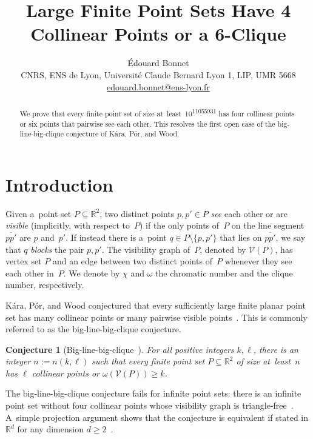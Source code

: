 \documentclass[11pt,a4paper]{article}
\author{\'Edouard Bonnet\\
        {CNRS, ENS de Lyon, Universit\'e Claude Bernard Lyon 1, LIP, UMR 5668}\\
        \href{mailto:edouard.bonnet@ens-lyon.fr}{edouard.bonnet@ens-lyon.fr}
}
\title{Large Finite Point Sets Have 4 Collinear Points or a 6-Clique}
\newtheorem{conjecture}{Conjecture}
\newcommand{\real}{\mathbb{R}}
\newcommand{\vis}{\mathcal V}
\begin{document}
\date{}

\maketitle

\begin{abstract}
  We prove that every finite point set of size at~least~10\textsuperscript{11055931} has four collinear points or six points that pairwise see each other.
  This resolves the first open case of the big-line-big-clique conjecture of Kára, Pór, and Wood. 
\end{abstract}

\section{Introduction}

Given a~point set $P \subseteq \real^2$, two distinct points $p, p' \in P$ \emph{see} each other or are \emph{visible} (implicitly, with respect to~$P$) if the only points of~$P$ on the line segment $\overline{pp'}$ are $p$ and~$p'$.
If instead there is a~point $q \in P \setminus \{p,p'\}$ that lies on $\overline{pp'}$, we say that $q$ \emph{blocks} the pair $p, p'$.
The visibility graph of~$P$, denoted by $\vis(P)$, has vertex set $P$ and an edge between two distinct points of~$P$ whenever they see each other in~$P$.
We denote by $\chi$ and $\omega$ the chromatic number and the clique number, respectively.

Kára, Pór, and Wood conjectured that every sufficiently large finite planar point set has many collinear points or many pairwise visible points~\cite{Kara05}.
This is commonly referred to as the big-line-big-clique conjecture.

\begin{conjecture}[Big-line-big-clique~\cite{Kara05}]\label{conj:blbc}
  For all positive integers $k, \ell$, there is an integer $n := n(k, \ell)$ such that every finite point set $P \subseteq \real^2$ of size at~least~$n$ has $\ell$ collinear points or $\omega(\vis(P)) \geqslant k$.  
\end{conjecture}

The big-line-big-clique conjecture fails for infinite point sets: there is an infinite point set without four collinear points whose visibility graph is triangle-free~\cite{Por10inf}.
A~simple projection argument shows that the conjecture is equivalent if stated in $\mathbb R^d$ for any dimension $d \geqslant 2$~\cite{Kara05}. 
\end{document}
